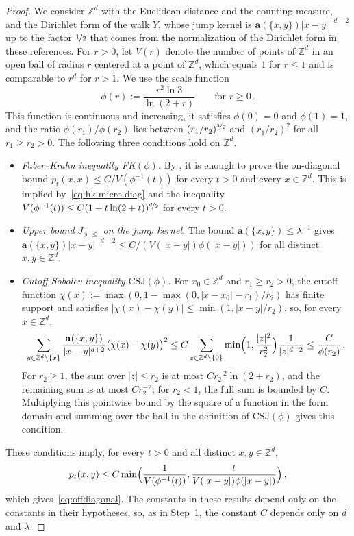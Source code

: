 \documentclass[11pt]{amsart}
\numberwithin{equation}{section}
\newcommand{\Z}{\mathbb{Z}}
\newcommand{\ba}{\mathbf{a}}
\newcommand{\nf}{\nicefrac}
\begin{document}
\begin{proof}
We consider $\Z^d$ with the Euclidean distance and the counting measure, and the Dirichlet form of the walk $Y$, whose jump kernel is $\ba(\{x,y\}) |x-y|^{-d-2}$ up to the factor $\nf12$ that comes from the normalization of the Dirichlet form in these references.
For $r > 0$, let $V(r)$ denote the number of points of $\Z^d$ in an open ball of radius $r$ centered at a point of $\Z^d$, which equals $1$ for $r \leq 1$ and is comparable to $r^d$ for $r > 1$.
We use the scale function
\begin{equation} \label{eq:hk.scale}
    \phi(r) := \frac{r^2 \ln 3}{\ln(2 + r)} \qquad \text{for } r \geq 0\,.
\end{equation}
This function is continuous and increasing, it satisfies $\phi(0) = 0$ and $\phi(1) = 1$, and the ratio $\phi(r_1)/\phi(r_2)$ lies between $(r_1/r_2)^{\nf32}$ and $(r_1/r_2)^2$ for all $r_1 \geq r_2 > 0$.
The following three conditions hold on $\Z^d$.
\begin{itemize}
    \item \emph{Faber--Krahn inequality FK$(\phi)$.} By \citet*[Proposition~7.6]{CKW2021Stability}, it is enough to prove the on-diagonal bound $p_t(x,x) \leq C / V(\phi^{-1}(t))$ for every $t > 0$ and every $x \in \Z^d$. This is implied by~\eqref{eq:hk.micro.diag} and the inequality $V(\phi^{-1}(t)) \leq C (1 + t \ln(2+t))^{\nf{d}{2}}$ for every $t > 0$.
    \item \emph{Upper bound $J_{\phi,\le}$ on the jump kernel.} The bound $\ba(\{x,y\}) \leq \lambda^{-1}$ gives $\ba(\{x,y\}) |x-y|^{-d-2} \leq C / (V(|x-y|) \phi(|x-y|))$ for all distinct $x, y \in \Z^d$.
    \item \emph{Cutoff Sobolev inequality $\mathrm{CSJ}(\phi)$.} For $x_0 \in \Z^d$ and $r_1 \geq r_2 > 0$, the cutoff function $\chi(x) := \max(0, 1 - \max(0, |x - x_0| - r_1) / r_2)$ has finite support and satisfies $|\chi(x) - \chi(y)| \leq \min(1, |x-y|/r_2)$, so, for every $x \in \Z^d$,
    \begin{equation*}
        \sum_{y \in \Z^d \setminus \{x\}} \frac{\ba(\{x,y\})}{|x - y|^{d+2}} \bigl( \chi(x) - \chi(y) \bigr)^2
        \leq C \sum_{z \in \Z^d \setminus \{0\}} \min \Bigl( 1, \frac{|z|^2}{r_2^2} \Bigr) \frac{1}{|z|^{d+2}}
        \leq \frac{C}{\phi(r_2)}\,.
    \end{equation*}
    For $r_2 \geq 1$, the sum over $|z| \leq r_2$ is at most $C r_2^{-2} \ln(2+r_2)$, and the remaining sum is at most $C r_2^{-2}$; for $r_2 < 1$, the full sum is bounded by $C$.
    Multiplying this pointwise bound by the square of a function in the form domain and summing over the ball in the definition of $\mathrm{CSJ}(\phi)$ gives this condition.
\end{itemize}
These conditions imply, for every $t > 0$ and all distinct $x, y \in \Z^d$,
\begin{equation*}
    p_t(x,y) \leq C \min \Bigl( \frac{1}{V(\phi^{-1}(t))}, \frac{t}{V(|x-y|) \phi(|x-y|)} \Bigr)\,,
\end{equation*}
which gives~\eqref{eq:offdiagonal}.
The constants in these results depend only on the constants in their hypotheses, so, as in Step~1, the constant $C$ depends only on $d$ and $\lambda$.


\end{proof}
\end{document}
